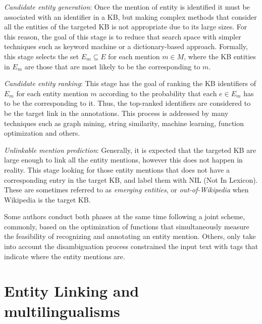 \documentclass{llncs}
\begin{document}
\begin{description}
\item \textit{Candidate entity generation}:
Once the mention of entity is identified it must be associated with an identifier in a KB, but making complex methods that consider all the entities of the targeted KB is not appropriate due to its large sizes. For this reason, the goal of this stage is to reduce that search space with simpler techniques such as keyword machine or a dictionary-based approach. Formally,  this stage selects the set $E_m \subseteq E$ for each mention $m\in{}M$, where the KB entities in $E_m$ are those that are most likely to be the corresponding to $m$. 

\item \textit{Candidate entity ranking}: 
This stage has the goal of ranking the KB identifiers of $E_m$ for each entity mention $m$ according to the probability that each $e\in{}E_m$ has to be the corresponding to it. Thus, the top-ranked identifiers are considered to be the target link in the annotations. This process is addressed by many techniques such as graph mining, string similarity, machine learning, function optimization and others.

\item \textit{Unlinkable mention prediction}: 
Generally, it is expected that the targeted KB are large enough to link all the entity mentions, however this does not happen in reality. This stage looking for those entity mentions that does not have a corresponding entry in the target KB, and label them with NIL (Not In Lexicon). These are sometimes referred to as \textit{emerging entities}, or \textit{out-of-Wikipedia} when Wikipedia is the target KB.  
\end{description}

Some authors conduct both phases at the same time following a joint scheme, commonly, based on the optimization of functions that simultaneously measure the feasibility of recognizing and annotating an entity mention. Others, only take into account the disambiguation process constrained the input text with tags that indicate where the entity mentions are. 



\section{Entity Linking and multilingualisms}
\end{document}
